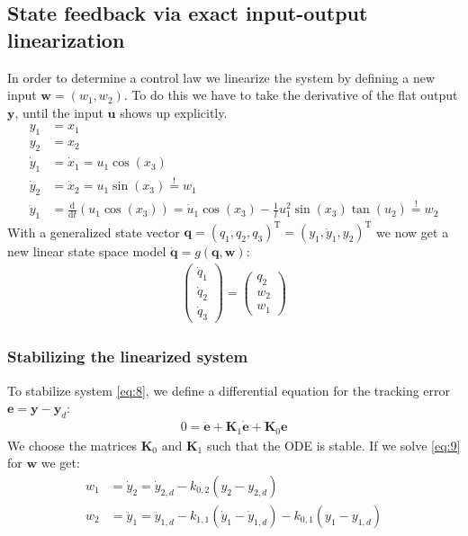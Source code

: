 \documentclass[a4paper,11pt,headings=standardclasses]{scrartcl}%
\renewcommand{\d}{\mathrm{d}} %
\newcommand{\uu}{\mathbf{u}}
\newcommand{\y}{\mathbf{y}}
\begin{document}
\subsection{State feedback via exact input-output linearization}
In order to determine a control law we linearize the system by defining a new input $\mathbf{w}=(w_1,w_2)$. To do this we have to take the derivative of the flat output $\y$, until the input $\uu$ shows up explicitly. 
\begin{subequations}
\begin{align}
y_1 &= x_1 \\
y_2 &= x_2 \\
\dot{y}_1 &= \dot{x}_1 = u_1 \cos(x_3)\\
\dot{y}_2 &= \dot{x}_2 = u_1 \sin(x_3) \overset{!}{=} w_1 \label{eq:7d}\\
\ddot{y}_1 &= \frac{\d}{\d t}(u_1 \cos(x_3)) = \dot{u}_1 \cos(x_3) - \frac{1}{l}u_1^2\sin(x_3)\tan(u_2) \overset{!}{=} w_2 \label{eq:7e}
\end{align}
\end{subequations}
With a generalized state vector $\mathbf{q} = (q_1,q_2,q_3)^\textrm{T}=(y_1,\dot{y}_1,y_2)^\textrm{T}$ we now get a new linear state space model $\dot{\mathbf{q}}=g(\mathbf{q},\mathbf{w})$:
\begin{align}
\label{eq:8}
\begin{pmatrix}
\dot{q}_1 \\\dot{q}_2 \\ \dot{q}_3
\end{pmatrix}
=
\begin{pmatrix}
q_2 \\ w_2 \\ w_1
\end{pmatrix}
\end{align}
\subsubsection{Stabilizing the linearized system}
To stabilize system \eqref{eq:8}, we define a differential equation for the tracking error $\mathbf{e}=\y-\y_d$:
\begin{align}
\label{eq:9}
0 = \ddot{\mathbf{e}} + \mathbf{K}_1 \dot{\mathbf{e}}+\mathbf{K}_0 \mathbf{e}
\end{align}
We choose the matrices $\mathbf{K}_0$ and $\mathbf{K}_1$ such that the ODE is stable.
If we solve \eqref{eq:9} for $\mathbf{w}$ we get:
\begin{subequations}
\label{eq:10}
\begin{align}
w_1 &=  \dot{y}_2 =\dot{y}_{2,d} - k_{0,2}(y_2-y_{2,d}) \\
w_2 &= \ddot{y}_1 = \ddot{y}_{1,d} - k_{1,1}(\dot{y}_1-\dot{y}_{1,d})-k_{0,1}(y_1-y_{1,d})
\end{align}
\end{subequations}
\end{document}
